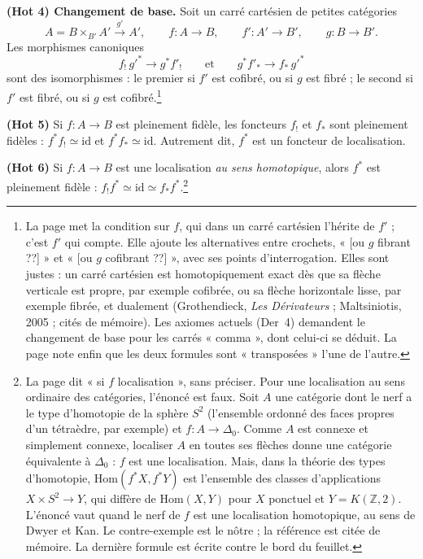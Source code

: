 \documentclass[11pt,a4paper]{article}
\begin{document}
\textbf{(Hot 4) Changement de base.} Soit un carré cartésien de petites
catégories
\[
  A = B \times_{B'} A' \xrightarrow{\ g'\ } A', \qquad f : A \to B, \qquad
  f' : A' \to B', \qquad g : B \to B'.
\]
Les morphismes canoniques
\[
  f_{!}\, g'^{*} \longrightarrow g^{*} f'_{!} \qquad \text{et} \qquad
  g^{*} f'_{*} \longrightarrow f_{*}\, g'^{*}
\]
sont des isomorphismes : le premier si $f'$ est cofibré, ou si $g$ est
fibré ; le second si $f'$ est fibré, ou si $g$ est cofibré.\footnote{La page
met la condition sur $f$, qui dans un carré cartésien l'hérite de $f'$ ; c'est
$f'$ qui compte. Elle ajoute les alternatives entre crochets, « [ou $g$ fibrant
??] » et « [ou $g$ cofibrant ??] », avec ses points d'interrogation. Elles
sont justes : un carré cartésien est homotopiquement exact dès que sa flèche
verticale est propre, par exemple cofibrée, ou sa flèche horizontale lisse,
par exemple fibrée, et dualement (Grothendieck, \emph{Les Dérivateurs} ;
Maltsiniotis, 2005 ; cités de mémoire). Les axiomes actuels (Der~4)
demandent le changement de base pour les carrés « comma », dont celui-ci
se déduit. La page note enfin que les deux formules sont « transposées »
l'une de l'autre.}

\textbf{(Hot 5)} Si $f : A \to B$ est pleinement fidèle, les foncteurs
$f_{!}$ et $f_{*}$ sont pleinement fidèles : $f^{*}f_{!} \simeq \mathrm{id}$ et
$f^{*}f_{*} \simeq \mathrm{id}$. Autrement dit, $f^{*}$ est un foncteur de
localisation.

\textbf{(Hot 6)} Si $f : A \to B$ est une localisation \emph{au sens
homotopique}, alors $f^{*}$ est pleinement fidèle : $f_{!}f^{*} \simeq
\mathrm{id} \simeq f_{*}f^{*}$.\footnote{La page dit « si $f$ localisation »,
sans préciser. Pour une localisation au sens ordinaire des catégories,
l'énoncé est faux. Soit $A$ une catégorie dont le nerf a le type
d'homotopie de la sphère $S^{2}$ (l'ensemble ordonné des faces propres d'un
tétraèdre, par exemple) et $f : A \to \Delta_0$. Comme $A$ est connexe et
simplement connexe, localiser $A$ en toutes ses flèches donne une catégorie
équivalente à $\Delta_0$ : $f$ est une localisation. Mais, dans la théorie
des types d'homotopie, $\mathrm{Hom}(f^{*}X, f^{*}Y)$ est l'ensemble des
classes d'applications $X \times S^{2} \to Y$, qui diffère de
$\mathrm{Hom}(X, Y)$ pour $X$ ponctuel et $Y = K(\mathbb Z, 2)$. L'énoncé
vaut quand le nerf de $f$ est une localisation homotopique, au sens de
Dwyer et Kan. Le contre-exemple est le nôtre ; la référence est citée de
mémoire. La dernière formule est écrite contre le bord du feuillet.}
\end{document}
